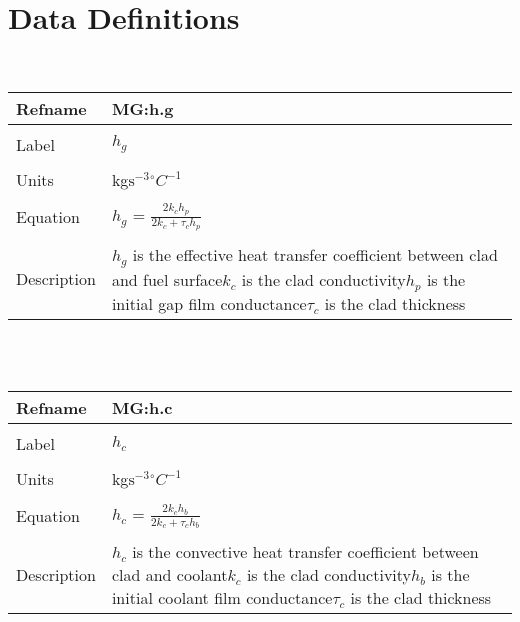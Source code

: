 \documentclass[12pt]{article}
\begin{document}
\section{Data Definitions}
\label{Sec:DD}
~\newline
\noindent \begin{minipage}{\textwidth}
\begin{tabular}{p{} p{}}
\toprule \textbf{Refname} & \textbf{MG:h.g}
\label{MG:h.g}
\\ \midrule \\
Label & $h_{g}$
\\ \midrule \\
Units & kg$\text{s}^{-3}$${}^{\circ}C^{-1}$
\\ \midrule \\
Equation & $h_{g}$ = $\frac{2k_{c}h_{p}}{2k_{c}+\tau{}_{c}h_{p}}$
\\ \midrule \\
Description & $h_{g}$ is the effective heat transfer coefficient between clad and fuel surface\newline$k_{c}$ is the clad conductivity\newline$h_{p}$ is the initial gap film conductance\newline$\tau{}_{c}$ is the clad thickness
\\ \bottomrule \end{tabular}
\end{minipage}\\
~\newline
\noindent \begin{minipage}{\textwidth}
\begin{tabular}{p{} p{}}
\toprule \textbf{Refname} & \textbf{MG:h.c}
\label{MG:h.c}
\\ \midrule \\
Label & $h_{c}$
\\ \midrule \\
Units & kg$\text{s}^{-3}$${}^{\circ}C^{-1}$
\\ \midrule \\
Equation & $h_{c}$ = $\frac{2k_{c}h_{b}}{2k_{c}+\tau{}_{c}h_{b}}$
\\ \midrule \\
Description & $h_{c}$ is the convective heat transfer coefficient between clad and coolant\newline$k_{c}$ is the clad conductivity\newline$h_{b}$ is the initial coolant film conductance\newline$\tau{}_{c}$ is the clad thickness
\\ \bottomrule \end{tabular}
\end{minipage}\\
\end{document}
